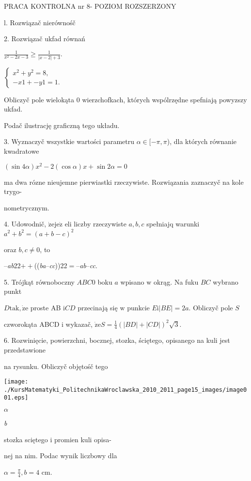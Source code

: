 \documentclass[a4paper,12pt]{article}
\begin{document}
PRACA KONTROLNA nr 8- POZIOM ROZSZERZONY

l. Rozwiązač nierównośč

2. Rozwiązač ukfad równań

$\displaystyle \frac{1}{x^{2}-2x-3}\geq\frac{1}{|x-2|+3}.$

$\left\{\begin{array}{l}
x^{2}+y^{2}=8,\\
- x1+-y1=1.
\end{array}\right.$

Obliczyč pole wielokąta $0$ wierzchofkach, których wspólrzędne spefniają powyzszy ukfad.

Podač ilustrację graficzną tego układu.

3. Wyznaczyč wszystkie wartości parametru $\alpha\in[-\pi,\pi$), dla których równanie kwadratowe

$(\sin 4\alpha)x^{2}-2(\cos\alpha)x+\sin 2\alpha=0$

ma dwa rózne nieujemne pierwiastki rzeczywiste. Rozwiązania zaznaczyč na kole trygo-

nometrycznym.

4. Udowodnič, $\dot{\mathrm{z}}\mathrm{e}\mathrm{j}\mathrm{e}\dot{\mathrm{z}}$ eli liczby rzeczywiste $a, b, c$ spełniajq warunki $a^{2}+b^{2}= (a+b-c)^{2}$

oraz $b, c\neq 0$, to

--{\it ab}22$++$(({\it ba}--{\it cc}))22$=$--{\it ab}--{\it cc}.

5. Trójkąt równoboczny $ABC0$ boku $a$ wpisano $\mathrm{w}$ okrąg. Na fuku $BC$ wybrano punkt

$D\mathrm{t}\mathrm{a}\mathrm{k}, \dot{\mathrm{z}}\mathrm{e}$ proste AB $\mathrm{i}CD$ przecinają się $\mathrm{w}$ punkcie $E\mathrm{i} |BE| = 2a$. Obliczyč pole $S$

czworokąta ABCD $\mathrm{i}$ wykazač, $\displaystyle \dot{\mathrm{z}}\mathrm{e}S=\frac{1}{4}(|BD|+|CD|)^{2}\sqrt{3}.$

6. Rozwinięcie, powierzchni, bocznej, stozka, ściętego, opisanego na kuli jest przedstawione

na rysunku. Obliczyč objętośč tego
\begin{center}
\texttt{[image: ./KursMatematyki\_PolitechnikaWroclawska\_2010\_2011\_page15\_images/image001.eps]}
\end{center}
$\alpha$

{\it b}

stozka sciętego $\mathrm{i}$ promien kuli opisa-

nej na nim. Podac wynik liczbowy dla

$\displaystyle \alpha=\frac{\pi}{4}, b=4$ cm.
\end{document}
